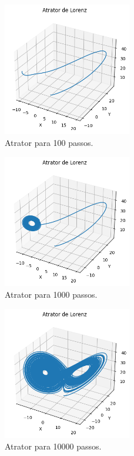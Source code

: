 \documentclass[12pt, a4paper]{article}
\begin{document}
\begin{figure}[H]
    \centering
    \includegraphics[width=0.5\textwidth]{img/attrator100.png}
    \caption{Atrator para 100 passos.}
    \label{fig:lorenz102}
\end{figure}

\begin{figure}[H]
    \centering
    \includegraphics[width=0.5\textwidth]{img/attrator1000.png}
    \caption{Atrator para 1000 passos.}
    \label{fig:lorenz103}
\end{figure}

\begin{figure}[H]
    \centering
    \includegraphics[width=0.5\textwidth]{img/attrator10000.png}
    \caption{Atrator para 10000 passos.}
    \label{fig:lorenz104}
\end{figure}
\end{document}
